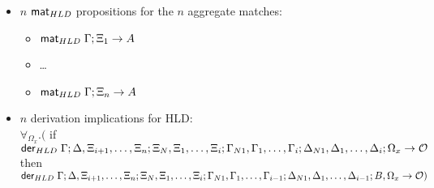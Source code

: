 \begin{theorem}
\begin{itemize}[leftmargin=*]
\begin{itemize}[leftmargin=\secondm]
      \item $n$ $\mathsf{mat}_{HLD} \;$propositions for the $n$ aggregate matches:
      \begin{itemize}[leftmargin=\thirdm]
         \item $\mathsf{mat}_{HLD} \; \Gamma; \Xi_1 \rightarrow A$
         \item \dots
         \item $\mathsf{mat}_{HLD} \; \Gamma; \Xi_n \rightarrow A$
      \end{itemize}

      \item $n$ derivation implications for HLD: \\
      $\forall_{\Omega_x}.($ if $\mathsf{der}_{HLD} \; \Gamma; \Delta, \Xi_{i+1}, \dotsc, \Xi_{n}; \Xi_N, \Xi_1,
            \dotsc, \Xi_i; \Gamma_{N1}, \Gamma_1, \dotsc, \Gamma_i; \Delta_{N1},
            \Delta_1, \dotsc, \Delta_i; \Omega_x \rightarrow \mathcal{O}$ then $\mathsf{der}_{HLD} \; \Gamma; \Delta, \Xi_{i+1}, \dotsc, \Xi_{n}; \Xi_N, \Xi_1,
            \dotsc,
            \Xi_i; \Gamma_{N1}, \Gamma_1, \dotsc, \Gamma_{i-1}; \Delta_{N1},
            \Delta_1, \dotsc, \Delta_{i-1}; B, \Omega_x \rightarrow \mathcal{O})$

   \end{itemize}

\end{itemize}
   
\end{theorem}
